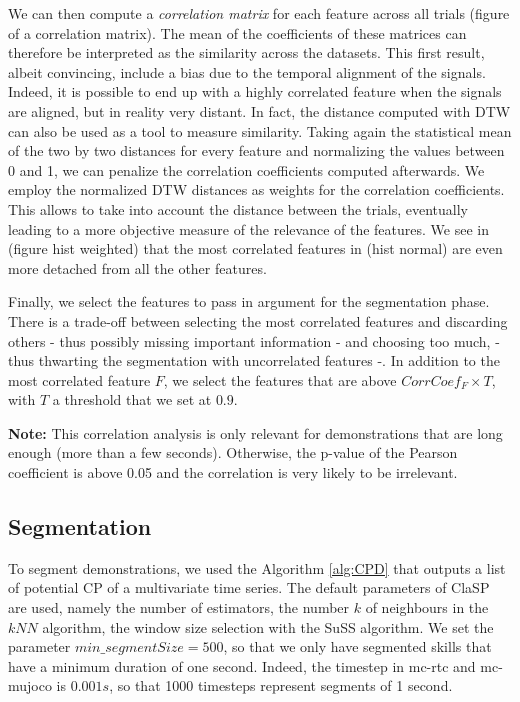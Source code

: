 \documentclass[conference]{IEEEtran}
\begin{document}
We can then compute a \textit{correlation matrix} for each feature across all trials (figure of a correlation matrix). The mean of the coefficients of these matrices can therefore be interpreted as the similarity across the datasets. This first result, albeit convincing, include a bias due to the temporal alignment of the signals. Indeed, it is possible to end up with a highly correlated feature when the signals are aligned, but in reality very distant. In fact, the distance computed with DTW can also be used as a tool to measure similarity. Taking again the statistical mean of the two by two distances for every feature and normalizing the values between 0 and 1, we can penalize the correlation coefficients computed afterwards. We employ the normalized DTW distances as weights for the correlation coefficients. This allows to take into account the distance between the trials, eventually leading to a more objective measure of the relevance of the features. We see in (figure hist weighted) that the most correlated features in (hist normal) are even more detached from all the other features.  

Finally, we select the features to pass in argument for the segmentation phase. There is a trade-off between selecting the most correlated features and discarding others - thus possibly missing important information - and choosing too much, - thus thwarting the segmentation with uncorrelated features -. In  addition to the most correlated feature $F$, we select the features that are above $CorrCoef_{F} \times T$, with $T$ a threshold that we set at $0.9$. \newline


\textbf{Note:} This correlation analysis is only relevant for demonstrations that are long enough (more than a few seconds). Otherwise, the p-value of the Pearson coefficient \cite{pearson} is above 0.05 and the correlation is very likely to be irrelevant.

\subsection{Segmentation} \label{method_segmentation}


To segment demonstrations, we used the  Algorithm \ref{alg:CPD} that outputs a list  of potential CP of a multivariate time series. The default parameters of  ClaSP are used, namely the  number of estimators, the number $k$ of neighbours in the $kNN$ algorithm, the window size selection with the  SuSS algorithm. We set the parameter $min\_segmentSize = 500$, so that we only have segmented skills that have a minimum duration of one second. Indeed, the timestep in mc-rtc and mc-mujoco \cite{singh2023mc} is $0.001s$, so that 1000 timesteps represent segments of 1 second. 
\end{document}
